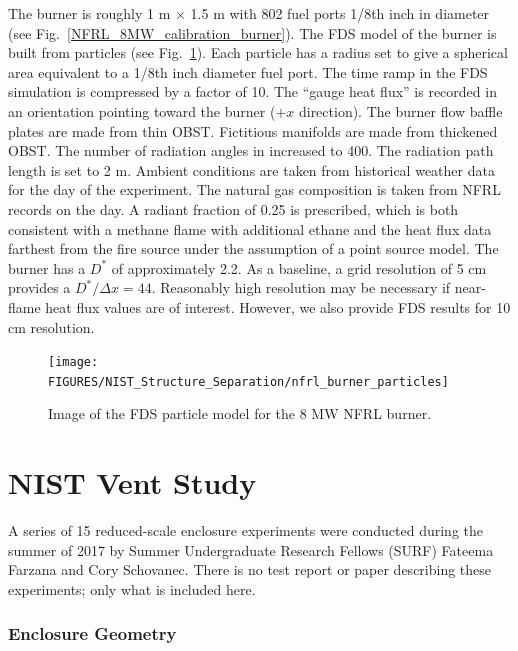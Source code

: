 The burner is roughly 1 m $\times$ 1.5 m with 802 fuel ports 1/8th inch in diameter (see Fig.~\ref{NFRL_8MW_calibration_burner}).  The FDS model of the burner is built from particles (see Fig.~\ref{FDS_NFRL_8MW_particle_burner}).  Each particle has a radius set to give a spherical area equivalent to a 1/8th inch diameter fuel port.  The time ramp in the FDS simulation is compressed by a factor of 10.  The ``gauge heat flux'' is recorded in an orientation pointing toward the burner ($+x$ direction).  The burner flow baffle plates are made from thin {\ct OBST}.  Fictitious manifolds are made from thickened {\ct OBST}.  The number of radiation angles in increased to 400.  The radiation path length is set to 2 m.  Ambient conditions are taken from historical weather data for the day of the experiment.  The natural gas composition is taken from NFRL records on the day.  A radiant fraction of 0.25 is prescribed, which is both consistent with a methane flame with additional ethane and the heat flux data farthest from the fire source under the assumption of a point source model.  The burner has a $D^*$ of approximately 2.2.  As a baseline, a grid resolution of 5 cm provides a $D^*/\Delta x = 44$.  Reasonably high resolution may be necessary if near-flame heat flux values are of interest.  However, we also provide FDS results for 10 cm resolution.

\begin{figure}[h]
\centering
\texttt{[image: FIGURES/NIST\_Structure\_Separation/nfrl\_burner\_particles]}
\caption[FDS particle model of NFRL 8 MW burner]{Image of the FDS particle model for the 8 MW NFRL burner.}
\label{FDS_NFRL_8MW_particle_burner}
\end{figure}


\section{NIST Vent Study}
\label{NIST_Vent_Description}

A series of 15 reduced-scale enclosure experiments were conducted during the summer of 2017 by Summer Undergraduate Research Fellows (SURF) Fateema Farzana and Cory Schovanec. There is no test report or paper describing these experiments; only what is included here.

\subsubsection{Enclosure Geometry}
\label{Enclosure_Geometry}

